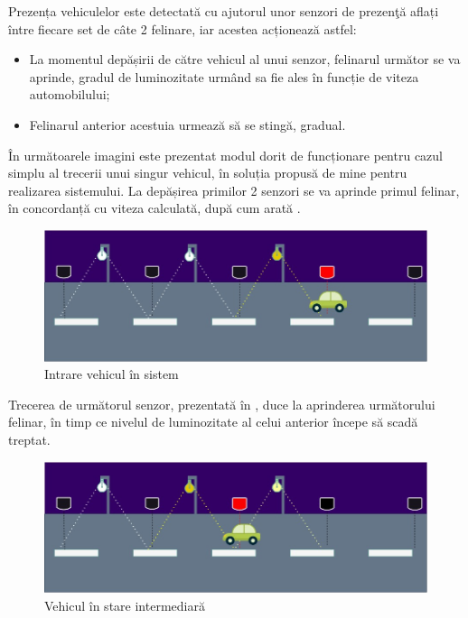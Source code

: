 Prezența vehiculelor este detectată cu ajutorul unor senzori de prezen\c{t}\u{a}
aflați între fiecare set de câte 2 felinare, iar acestea acționează astfel:

\begin{itemize}
    \item  La momentul depășirii de către vehicul al unui senzor, felinarul următor se va aprinde, gradul de luminozitate urm\^{a}nd sa fie ales în funcție de viteza automobilului;
    \item  Felinarul anterior acestuia urmează să se stingă, gradual.
\end{itemize}

În următoarele imagini este prezentat modul dorit de funcționare pentru cazul simplu al trecerii unui singur vehicul, în soluția propusă de mine pentru realizarea sistemului. La depășirea primilor 2 senzori se va aprinde primul felinar, în concordanță cu viteza calculată, după cum arată .
  
 \begin{figure}[!ht]
    \begin{center}
    \includegraphics[width=0.9\linewidth,keepaspectratio]{pics/cardraw1.jpg}
    \end{center}
    \caption{Intrare vehicul în sistem}
    \label{fig:car1}
\end{figure}

Trecerea de următorul senzor, prezentată în , duce la aprinderea următorului felinar, în timp ce nivelul de luminozitate al celui anterior începe să scadă treptat.

 \begin{figure}[!ht]
    \begin{center}
    \includegraphics[width=0.9\linewidth,keepaspectratio]{pics/cardraw2.jpg}
    \end{center}
    \caption{Vehicul în stare intermediară}
    \label{fig:car2}
\end{figure}

